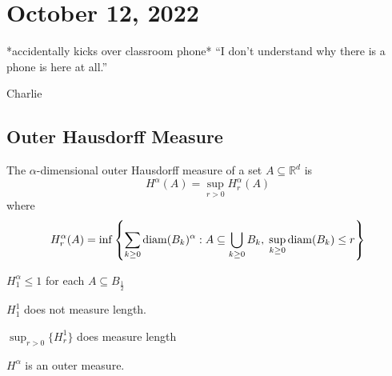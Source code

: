 \section{October 12, 2022}

\epigraph{*accidentally kicks over classroom phone* ``I don't understand why there is a phone is here at all.''}{Charlie}

\subsection{Outer Hausdorff Measure}
The $\alpha$-dimensional outer Hausdorff measure of a set $A \subseteq \mathbb{R}^d$ is
\[
	H^{\alpha} (A) = \sup_{r > 0} H_{r}^{\alpha} (A)
\]
where
\[
	H_{r}^{\alpha} (A) = \inf\left\{ \sum_{k \geq 0} \operatorname*{diam} (B_k)^{\alpha} : A \subseteq \bigcup_{k \geq 0} B_k, \; \sup_{k \geq 0} \operatorname*{diam} (B_{k} ) \leq r \right\}
\]

\begin{example}
	$H_{1}^{\alpha} \leq 1$ for each $A \subseteq B_{\frac{1}{2}}$

	$H_{1}^{1}$ does not measure length.

	$\sup_{r > 0} \{H_{r}^{1}\}$ does measure length
\end{example}

\begin{lemma}
	$H^{\alpha}$ is an outer measure.
\end{lemma}

